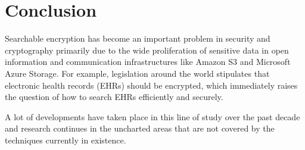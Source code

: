 \documentclass[12pt,a4paper]{article}
\theoremstyle{definition}
\begin{document}
\section{Conclusion}
Searchable encryption has become an important problem in security and
cryptography primarily due to the wide proliferation of sensitive data
in open information and communication infrastructures like Amazon S3 and
Microsoft Azure Storage. For example, legislation around the world
stipulates that electronic health records (EHRs) should be encrypted,
which immediately raises the question of how to search EHRs efficiently
and securely.

A lot of developments have taken place in this line of study over the
past decade and research continues in the uncharted areas that are not
covered by the techniques currently in existence.

\clearpage
\nocite{*}
\printbibliography
\end{document}
